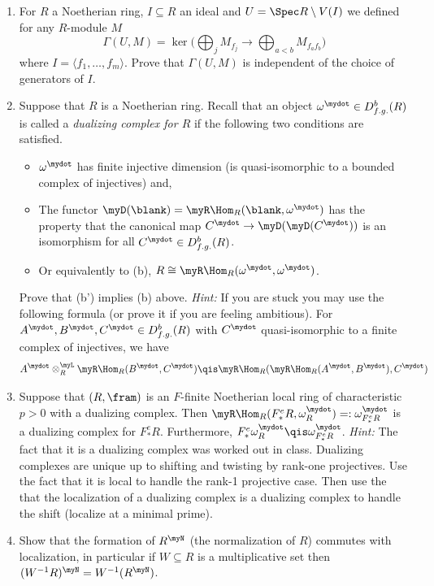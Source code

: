 \documentclass[12pt]{amsart}
\numberwithin{equation}{theorem}
\renewcommand{\:}{\colon}
\theoremstyle{theorem}
\begin{document}
\begin{enumerate}[label=(\arabic*)]
\item For $R$ a Noetherian ring, $I \subseteq R$ an ideal and $U = \Spec R \setminus V(I)$ we defined for any $R$-module $M$
\[
\Gamma(U, M) = \ker \Big( \bigoplus_j M_{f_j} \to \bigoplus_{a < b} M_{f_{a} f_b} \big)
\]
where $I = \langle f_1, \ldots, f_m \rangle$.  Prove that $\Gamma(U, M)$ is independent of the choice of generators of $I$.
\item
Suppose that $R$ is a Noetherian ring.  Recall that an object $\omega^{\mydot} \in D^b_{f.g.}(R)$ is called a \emph{dualizing complex for $R$} if the following two conditions are satisfied.
\begin{itemize}
\item[(a)] $\omega^{\mydot}$ has finite injective dimension (is quasi-isomorphic to a bounded complex of injectives) and,
\item[(b)] The functor $\myD(\blank) = \myR \Hom_R(\blank, \omega^{\mydot})$ has the property that the canonical map $C^{\mydot} \to \myD(\myD(C^{\mydot}))$ is an isomorphism for all $C^{\mydot} \in D^b_{f.g.}(R)$.
\item[(b')] Or equivalently to (b), $R \cong \myR \Hom_R(\omega^{\mydot}, \omega^{\mydot})$.
\end{itemize}
Prove that (b') implies (b) above.
\vskip 3pt
\emph{Hint:} If you are stuck you may use the following formula (or prove it if you are feeling ambitious).  For $A^{\mydot}, B^{\mydot}, C^{\mydot} \in D^b_{f.g.}(R)$ with $C^{\mydot}$ quasi-isomorphic to a finite complex of injectives, we have
\[
A^{\mydot} \otimes^{\myL}_R \myR \Hom_R(B^{\mydot}, C^{\mydot}) \qis \myR \Hom_R(\myR \Hom_R(A^{\mydot}, B^{\mydot}), C^{\mydot})
\]
\item Suppose that $(R, \fram)$ is an $F$-finite Noetherian local ring of characteristic $p > 0$ with a dualizing complex.  Then $\myR \Hom_R(F^e_* R, \omega_R^{\mydot}) =: \omega_{F^e_* R}^{\mydot}$ is a dualizing complex for $F^e_* R$.  Furthermore, $F^e_* \omega_R^{\mydot} \qis \omega_{F^e_* R}^{\mydot}$.
    \vskip 3pt
    \emph{Hint:} The fact that it is a dualizing complex was worked out in class.  Dualizing complexes are unique up to shifting and twisting by rank-one projectives.  Use the fact that it is local to handle the rank-1 projective case.  Then use the that the localization of a dualizing complex is a dualizing complex to handle the shift (localize at a minimal prime).
\item Show that the formation of $R^{\myN}$ (the normalization of $R$) commutes with localization, in particular if $W \subseteq R$ is a multiplicative set then $(W^{-1} R)^{\myN} = W^{-1} (R^{\myN})$.

\end{enumerate}
\end{document}
